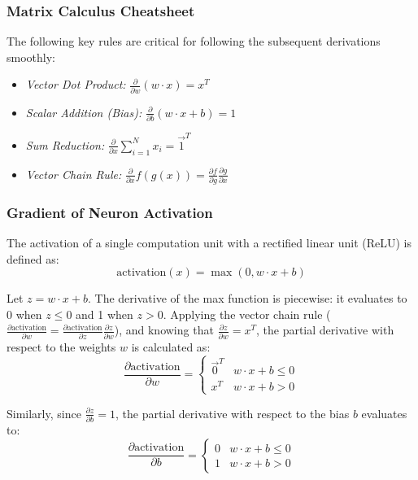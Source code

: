 \documentclass[conference]{IEEEtran}
\begin{document}
\subsubsection{Matrix Calculus Cheatsheet}
The following key rules are critical for following the subsequent derivations smoothly:
\begin{itemize}
    \item[$\bullet$] \textit{Vector Dot Product:} $\frac{\partial}{\partial w} (w \cdot x) = x^T$
    \item[$\bullet$] \textit{Scalar Addition (Bias):} $\frac{\partial}{\partial b} (w \cdot x + b) = 1$
    \item[$\bullet$] \textit{Sum Reduction:} $\frac{\partial}{\partial x} \sum_{i=1}^N x_i = \vec{1}^T$
    \item[$\bullet$] \textit{Vector Chain Rule:} $\frac{\partial}{\partial x} f(g(x)) = \frac{\partial f}{\partial g} \frac{\partial g}{\partial x}$
\end{itemize}

\subsubsection{Gradient of Neuron Activation}
The activation of a single computation unit with a rectified linear unit (ReLU) is defined as:
\begin{equation}
\text{activation}(x) = \max(0, w \cdot x + b)
\end{equation}

Let $z = w \cdot x + b$. The derivative of the max function is piecewise: it evaluates to 0 when $z \le 0$ and 1 when $z > 0$. Applying the vector chain rule ($\frac{\partial \text{activation}}{\partial w} = \frac{\partial \text{activation}}{\partial z} \frac{\partial z}{\partial w}$), and knowing that $\frac{\partial z}{\partial w} = x^T$, the partial derivative with respect to the weights $w$ is calculated as:
\begin{equation}
\frac{\partial \text{activation}}{\partial w} = 
\begin{cases} 
\vec{0}^T & w \cdot x + b \le 0 \\ 
x^T & w \cdot x + b > 0 
\end{cases}
\end{equation}

Similarly, since $\frac{\partial z}{\partial b} = 1$, the partial derivative with respect to the bias $b$ evaluates to:
\begin{equation}
\frac{\partial \text{activation}}{\partial b} = 
\begin{cases} 
0 & w \cdot x + b \le 0 \\ 
1 & w \cdot x + b > 0 
\end{cases}
\end{equation}
\end{document}
